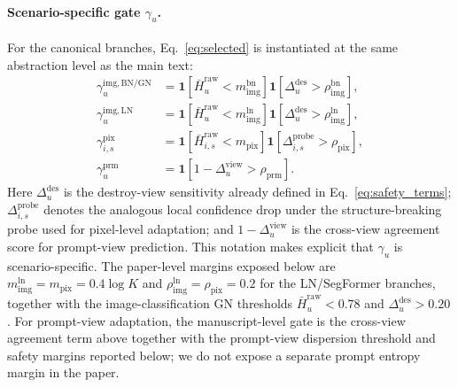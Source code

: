 \paragraph{Scenario-specific gate $\gamma_u$.}
For the canonical branches, Eq.~\ref{eq:selected} is instantiated at the same abstraction level as the main text:
\begin{align}
\gamma_u^{\mathrm{img,BN/GN}}
&=
\mathbf{1}[\bar H_u^{\mathrm{raw}}<m_{\mathrm{img}}^{\mathrm{bn}}]
\mathbf{1}[\Delta_u^{\mathrm{des}}>\rho_{\mathrm{img}}^{\mathrm{bn}}],
\\
\gamma_u^{\mathrm{img,LN}}
&=
\mathbf{1}[\bar H_u^{\mathrm{raw}}<m_{\mathrm{img}}^{\mathrm{ln}}]
\mathbf{1}[\Delta_u^{\mathrm{des}}>\rho_{\mathrm{img}}^{\mathrm{ln}}],
\\
\gamma_{i,s}^{\mathrm{pix}}
&=
\mathbf{1}[\bar H_{i,s}^{\mathrm{raw}}<m_{\mathrm{pix}}]
\mathbf{1}[\Delta_{i,s}^{\mathrm{probe}}>\rho_{\mathrm{pix}}],
\\
\gamma_u^{\mathrm{prm}}
&=
\mathbf{1}[1-\Delta_u^{\mathrm{view}}>\rho_{\mathrm{prm}}].
\end{align}
Here $\Delta_u^{\mathrm{des}}$ is the destroy-view sensitivity already defined in Eq.~\ref{eq:safety_terms}; $\Delta_{i,s}^{\mathrm{probe}}$ denotes the analogous local confidence drop under the structure-breaking probe used for pixel-level adaptation; and $1-\Delta_u^{\mathrm{view}}$ is the cross-view agreement score for prompt-view prediction. This notation makes explicit that $\gamma_u$ is scenario-specific. The paper-level margins exposed below are $m_{\mathrm{img}}^{\mathrm{ln}}=m_{\mathrm{pix}}=0.4\log K$ and $\rho_{\mathrm{img}}^{\mathrm{ln}}=\rho_{\mathrm{pix}}=0.2$ for the LN/SegFormer branches, together with the image-classification GN thresholds $\bar H_u^{\mathrm{raw}}<0.78$ and $\Delta_u^{\mathrm{des}}>0.20$. For prompt-view adaptation, the manuscript-level gate is the cross-view agreement term above together with the prompt-view dispersion threshold and safety margins reported below; we do not expose a separate prompt entropy margin in the paper.

